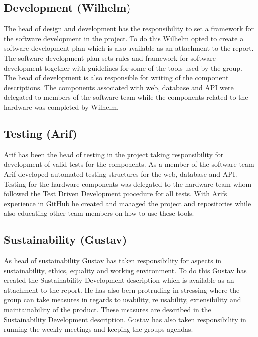 \subsection{Development (Wilhelm)}
The head of design and development has the responsibility to set a framework for the software development in the project. To do this Wilhelm opted to create a software development plan which is also available as an attachment to the report. The software development plan sets rules and framework for software development together with guidelines for some of the tools used by the group. The head of development is also responsible for writing of the component descriptions. The components associated with web, database and API were delegated to members of the software team while the components related to the hardware was completed by Wilhelm.

\subsection{Testing (Arif)}
Arif has been the head of testing in the project taking responsibility for development of valid tests for the components. As a member of the software team Arif developed automated testing structures for the web, database and API. Testing for the hardware components was delegated to the hardware team whom followed the Test Driven Development procedure for all tests. With Arifs experience in GitHub he created and managed the project and repositories while also educating other team members on how to use these tools. 

\subsection{Sustainability (Gustav)}
As head of sustainability Gustav has taken responsibility for aspects in sustainability, ethics, equality and working environment. To do this Gustav has created the Sustainability Development description which is available as an attachment to the report. He has also been protruding in stressing where the group can take measures in regards to usability, re usability, extensibility and maintainability of the product. These measures are described in the Sustainability Development description. Gustav has also taken responsibility in running the weekly meetings and keeping the groups agendas. 

